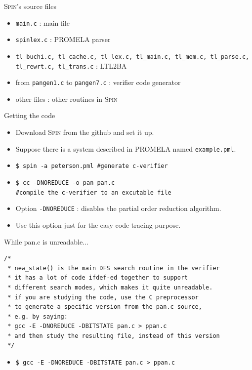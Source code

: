 \documentclass[12pt]{beamer}
\newcommand{\code}[1]{\texttt{#1}}
\begin{document}
\begin{frame}{\textsc{Spin}'s source files}
    \begin{itemize}
        \item \code{main.c} : main file
        \item \code{spinlex.c} : PROMELA parser
        \item \code{tl\_buchi.c, tl\_cache.c, tl\_lex.c, tl\_main.c, tl\_mem.c, tl\_parse.c, tl\_rewrt.c, tl\_trans.c} : LTL2BA
        \item from \code{pangen1.c} to \code{pangen7.c} : verifier code generator
        \item other files : other routines in \textsc{Spin}
    \end{itemize}
\end{frame}

\begin{frame}{Getting the code}
    \begin{itemize}
        \item Download \textsc{Spin} from the github and set it up.
        \item Suppose there is a system described in PROMELA named \code{example.pml}.
        \item \code{\$ spin -a peterson.pml   \hspace{1cm}\#generate c-verifier}
        \item \code{\$ cc -DNOREDUCE -o pan pan.c} \\ \code{\#compile the c-verifier to an excutable file}
        \item Option \code{-DNOREDUCE} : disables the partial order reduction algorithm.
        \item Use this option just for the easy code tracing purpose.
    \end{itemize}
\end{frame}

\begin{frame}[fragile]{While pan.c is unreadable...}

\begin{lstlisting}[basicstyle=\footnotesize]
/*
 * new_state() is the main DFS search routine in the verifier
 * it has a lot of code ifdef-ed together to support
 * different search modes, which makes it quite unreadable.
 * if you are studying the code, use the C preprocessor
 * to generate a specific version from the pan.c source,
 * e.g. by saying:
 * gcc -E -DNOREDUCE -DBITSTATE pan.c > ppan.c
 * and then study the resulting file, instead of this version
 */\end{lstlisting}
     \begin{itemize}
         \item \code{\$ gcc -E -DNOREDUCE -DBITSTATE pan.c > ppan.c}
     \end{itemize}
\end{frame}
\end{document}
